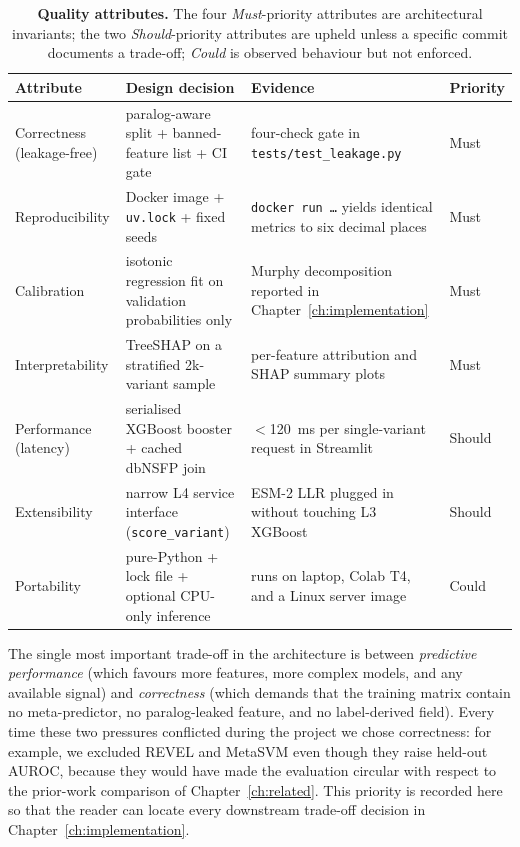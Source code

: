 \documentclass[11pt,a4paper,oneside]{report}
\begin{document}
\begin{table}[htbp]
\centering
\footnotesize
\begin{tabularx}{\linewidth}{@{}l X X l@{}}
\toprule
\textbf{Attribute} & \textbf{Design decision} & \textbf{Evidence} & \textbf{Priority} \\
\midrule
Correctness (leakage-free) &
paralog-aware split + banned-feature list + CI gate &
four-check gate in \texttt{tests/test\_leakage.py} &
Must \\
Reproducibility &
Docker image + \texttt{uv.lock} + fixed seeds &
\texttt{docker run \dots} yields identical metrics to six decimal places &
Must \\
Calibration &
isotonic regression fit on validation probabilities only &
Murphy decomposition reported in Chapter~\ref{ch:implementation} &
Must \\
Interpretability &
TreeSHAP on a stratified 2k-variant sample &
per-feature attribution and SHAP summary plots &
Must \\
Performance (latency) &
serialised XGBoost booster + cached dbNSFP join &
$<$120~ms per single-variant request in Streamlit &
Should \\
Extensibility &
narrow L4 service interface (\texttt{score\_variant}) &
ESM-2 LLR plugged in without touching L3 XGBoost &
Should \\
Portability &
pure-Python + lock file + optional CPU-only inference &
runs on laptop, Colab T4, and a Linux server image &
Could \\
\bottomrule
\end{tabularx}
\caption[Quality attributes]{\textbf{Quality attributes.} The
four \emph{Must}-priority attributes are architectural
invariants; the two \emph{Should}-priority attributes are
upheld unless a specific commit documents a trade-off;
\emph{Could} is observed behaviour but not enforced.}
\label{tab:quality}
\end{table}

The single most important trade-off in the architecture is
between \emph{predictive performance} (which favours more
features, more complex models, and any available signal)
and \emph{correctness} (which demands that the training
matrix contain no meta-predictor, no paralog-leaked feature,
and no label-derived field). Every time these two
pressures conflicted during the project we chose
correctness: for example, we excluded REVEL and MetaSVM
even though they raise held-out AUROC, because they would
have made the evaluation circular with respect to the
prior-work comparison of Chapter~\ref{ch:related}. This
priority is recorded here so that the reader can locate
every downstream trade-off decision in
Chapter~\ref{ch:implementation}.
\end{document}
